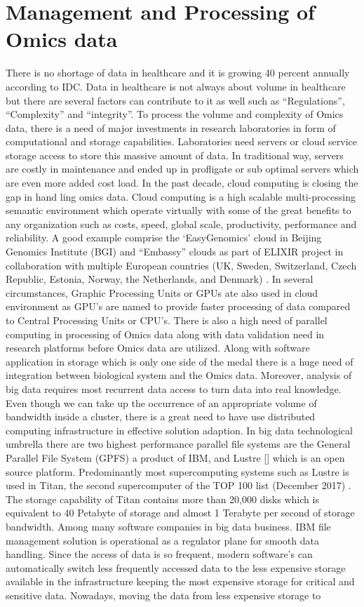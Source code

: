 \documentclass[sigconf]{acmart}
\begin{document}
\section{Management and Processing of Omics data} There is no shortage of data in healthcare and it is growing 40 percent annually according to IDC. Data in healthcare is not always about volume in healthcare but there are several factors can contribute to it as well such as “Regulations”, “Complexity” and “integrity”. To process the volume and complexity of Omics data, there is a need of major investments in research laboratories in form of computational and storage capabilities. Laboratories need servers or cloud service storage access to store this massive amount of data. In traditional way, servers are costly in maintenance and ended up in profligate or sub optimal servers which are even more added cost load. In the past decade, cloud computing is closing the gap in hand ling omics data. Cloud computing is a high scalable multi-processing semantic environment which operate virtually with some of the great benefits to any organization such as costs, speed, global scale, productivity, performance and reliability. A good example comprise the ‘EasyGenomics’ cloud in Beijing Genomics Institute (BGI) and “Embassy” clouds as part of ELIXIR project in collaboration with multiple European countries (UK, Sweden, Switzerland, Czech Republic, Estonia, Norway, the Netherlands, and Denmark) \cite{editor10}. In several circumstances, Graphic Processing Units or GPUs ate also used in cloud environment as GPU’s are named to provide faster processing of data compared to Central Processing Units or CPU’s. There is also a high need of parallel computing in processing of Omics data along with data validation need in research platforms before Omics data are utilized. Along with software application in storage which is only one side of the medal there is a huge need of integration between biological system and the Omics data. Moreover, analysis of big data requires most recurrent data access to turn data into real knowledge. Even though we can take up the occurrence of an appropriate volume of bandwidth inside a cluster, there is a great need to have use distributed computing infrastructure in effective solution adaption. In big data technological umbrella there are two highest performance parallel file systems are the General Parallel File System (GPFS) \cite{editor10} a product of  IBM, and Lustre [] which is an open source platform. Predominantly most supercomputing systems such as Lustre is used in Titan, the second supercomputer of the TOP 100 list (December 2017) \cite{editor10}. The storage capability of Titan contains more than 20,000 disks which is equivalent to 40 Petabyte of storage and almost 1 Terabyte per second of storage bandwidth.  Among many software companies in big data business.  IBM file management solution is operational as a regulator plane for smooth data handling.  Since the access of data is so frequent, modern software’s can automatically switch less frequently accessed data to the less expensive storage available in the infrastructure keeping the most expensive storage for critical and sensitive data. Nowadays, moving the data from less expensive storage to 
\end{document}
